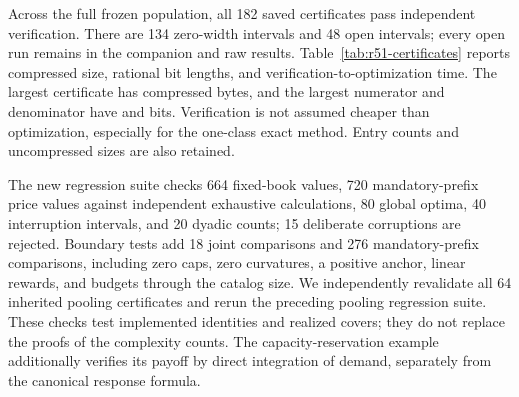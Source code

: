 Across the full frozen population, all 182 saved certificates pass independent verification. There are 134 zero-width intervals and 48 open intervals; every open run remains in the companion and raw results. Table~\ref{tab:r51-certificates} reports compressed size, rational bit lengths, and verification-to-optimization time. The largest certificate has \rFiftyOneMaxBytes{} compressed bytes, and the largest numerator and denominator have \rFiftyOneNumBits{} and \rFiftyOneDenBits{} bits. Verification is not assumed cheaper than optimization, especially for the one-class exact method. Entry counts and uncompressed sizes are also retained.

The new regression suite checks 664 fixed-book values, 720 mandatory-prefix price values against independent exhaustive calculations, 80 global optima, 40 interruption intervals, and 20 dyadic counts; 15 deliberate corruptions are rejected. Boundary tests add 18 joint comparisons and 276 mandatory-prefix comparisons, including zero caps, zero curvatures, a positive anchor, linear rewards, and budgets through the catalog size. We independently revalidate all 64 inherited pooling certificates and rerun the preceding pooling regression suite. These checks test implemented identities and realized covers; they do not replace the proofs of the complexity counts. The capacity-reservation example additionally verifies its payoff by direct integration of demand, separately from the canonical response formula.
